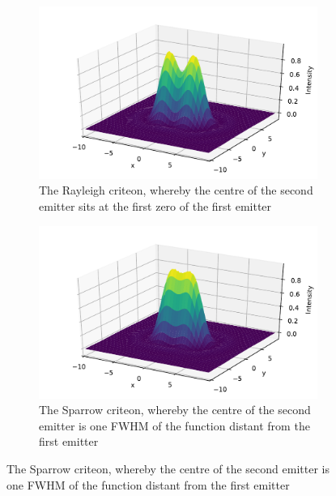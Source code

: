 \begin{figure}
    \centering
    \begin{subfigure}[b]{\textwidth}
        \includegraphics{+airy_rayleigh}
        \caption{The Rayleigh criteon, whereby the centre of the second emitter sits at the first zero of the first emitter}
        \label{fig:airy_rayleigh}
    \end{subfigure}
    \begin{subfigure}[b]{\textwidth}
        \includegraphics{+airy_sparrow}
        \caption{The Sparrow criteon, whereby the centre of the second emitter is one FWHM of the function distant from the first emitter}
        \label{fig:airy_sparrow}
    \end{subfigure}
    \end{figure}
